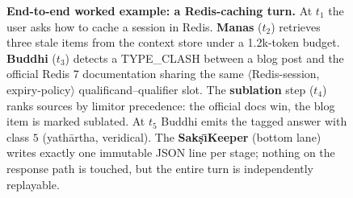 \begin{figure}[!tbp]
{}
\caption{\textbf{End-to-end worked example: a Redis-caching turn.}
At $t_1$ the user asks how to cache a session in Redis. \textbf{Manas}
($t_2$) retrieves three stale items from the context store under a
1.2k-token budget. \textbf{Buddhi} ($t_3$) detects a TYPE\_CLASH between
a blog post and the official Redis 7 documentation sharing the same
$\langle$Redis-session, expiry-policy$\rangle$ qualificand--qualifier
slot. The \textbf{sublation} step ($t_4$) ranks sources by limitor
precedence: the official docs win, the blog item is marked sublated.
At $t_5$ Buddhi emits the tagged answer with class $5$ (yath\=artha,
veridical). The \textbf{Sak\d{s}\=\i Keeper} (bottom lane) writes
exactly one immutable JSON line per stage; nothing on the response path
is touched, but the entire turn is independently replayable.}
\label{fig:swimlane}
\end{figure}
